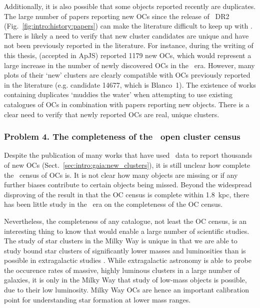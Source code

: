 Additionally, it is also possible that some objects reported recently are duplicates. The large number of papers reporting new OCs since the release of \gaia\ DR2 (Fig.~\ref{fig:intro:history:papers}) can make the literature difficult to keep up with \citep{cantat-gaudin_milky_2022}. There is likely a need to verify that new cluster candidates are unique and have not been previously reported in the literature. For instance, during the writing of this thesis, \cite{chi_blind_search_2023} (accepted in ApJS) reported 1179 new OCs, which would represent a large increase in the number of newly discovered OCs in the \gaia\ era. However, many plots of their `new' clusters are clearly compatible with OCs previously reported in the literature (e.g. candidate 14677, which is Blanco~1). The existence of works containing duplicates `muddies the water' when attempting to use existing catalogues of OCs in combination with papers reporting new objects. There is a clear need to verify that newly reported OCs are real, unique clusters. 


\subsubsection{Problem 4. The completeness of the \gaia\ open cluster census}
\label{sec:intro:aims:issues:completeness}

Despite the publication of many works that have used \gaia\ data to report thousands of new OCs (Sect.~\ref{sec:intro:gaia:new_clusters}), it is still unclear how complete the \gaia\ census of OCs is. It is not clear how many objects are missing or if any further biases contribute to certain objects being missed. Beyond the widespread disproving of the result in \cite{kharchenko_global_2013} that the OC census is complete within 1.8~kpc, there has been little study in the \gaia\ era on the completeness of the OC census.

Nevertheless, the completeness of any catalogue, not least the OC census, is an interesting thing to know that would enable a large number of scientific studies. The study of star clusters in the Milky Way is unique in that we are able to study bound star clusters of significantly lower masses and luminosities than is possible in extragalactic studies \citep{portegies_zwart_young_2010}. While extragalactic astronomy is able to probe the occurence rates of massive, highly luminous clusters in a large number of galaxies, it is only in the Milky Way that study of low-mass objects is possible, due to their low luminosity. Milky Way OCs are hence an important calibration point for understanding star formation at lower mass ranges.

